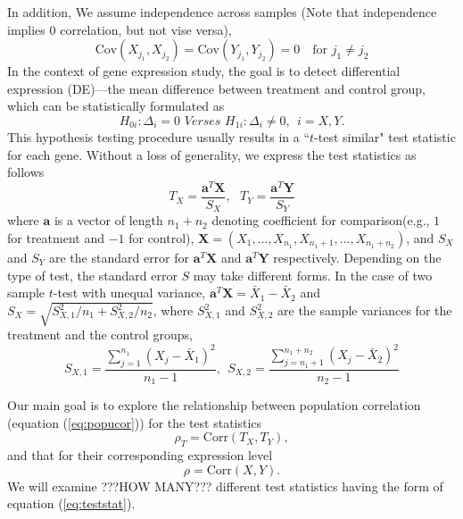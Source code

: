 \documentclass[12pt, a4paper]{article}
\newcommand{\cov}{\text{Cov}}
\newcommand{\cor}{\text{Corr}}
\begin{document}
	In addition, We assume independence across samples (Note that independence implies 0 correlation, but not vise versa), 
	\begin{equation}\label{eq:indepsamples}
	\cov(X_{j_1}, X_{j_2}) = \cov(Y_{j_1}, Y_{j_2}) = 0 \text{~~~for $j_1\neq j_2$}
	\end{equation}
	 In the context of gene expression study, the goal is to detect differential expression (DE)---the mean difference between treatment and control group, which can be statistically formulated as 
	 \begin{equation}\label{eq:hypotheses}
	 H_{0i}:  \Delta_i = 0 \textit{     Verses   }  H_{1i}: \Delta_i\neq 0 ,  ~~ i = X, Y.
	 \end{equation}
	This hypothesis testing procedure usually results in a ``$t$-test similar" test statistic for each gene. Without a loss of generality, we express the test statistics as follows
	\begin{equation}\label{eq:teststat}
	T_X = \dfrac{\bm a^T\bm X}{S_X},  ~~~ T_Y = \dfrac{\bm a^T \bm Y}{S_Y}
	\end{equation}  
	where $\bm a$ is a vector of length $n_1 + n_2$ denoting coefficient for comparison(e.g., $1$ for treatment and $-1$ for control), $\bm X = (X_1, \ldots, X_{n_1}, X_{n_1 +1}, \ldots, X_{n_1 + n_2})$, and  $S_X$ and $S_Y$ are the standard error for $\bm a^T\bm X$ and $\bm a^T\bm Y$ respectively. Depending on the type of test, the standard error $S$ may take different forms. In the case of two sample $t$-test with unequal variance, $\bm a^T\bm X = \bar{X}_1 - \bar{X}_2$ and $S_X = \sqrt{S_{X,1}^2/n_1 + S_{X,2}^2/n_2}$, where $ S_{X,1}^2$ and $S_{X,2}^2$ are the sample variances for the treatment and the control groups,
	\begin{equation}\label{eq:samplevariance}
	S_{X, 1} =  \frac{\sum_{j=1}^{n_1}(X_j - \bar{X}_1)^2}{n_1 -1}, ~~S_{X, 2} =  \frac{\sum_{j=n_1 +1}^{n_1 + n_2}(X_j - \bar{X}_2)^2}{n_2 -1}
	\end{equation}
	
	
	Our main goal is to explore the relationship between population correlation (equation (\ref{eq:popucor})) for the test statistics 
	\begin{equation}
	\rho_T = \cor({T_X, T_Y}),
	\end{equation}  
	and that for their corresponding expression level 
	\begin{equation}
	\rho = \cor(X, Y). 
	\end{equation}
	We will examine ???HOW MANY??? different test statistics having the form of equation (\ref{eq:teststat}).%
	
\end{document}
